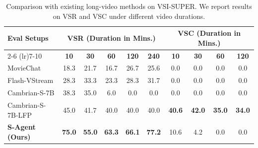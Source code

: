 \begin{table}[t]
    \centering
    \small
    \setlength{\tabcolsep}{8pt}
    \caption{Comparison with existing long-video methods on VSI-SUPER. We report results on VSR and VSC under different video durations.}
    \label{tab:vsi_super}
    \begin{tabular}{l|ccccc|cccc}
        \toprule
        \multirow{2}{*}{\textbf{Eval Setups}} 
        & \multicolumn{5}{c|}{\textbf{VSR (Duration in Mins.)}} 
        & \multicolumn{4}{c}{\textbf{VSC (Duration in Mins.)}} \\
        \cmidrule(lr){2-6} \cmidrule(lr){7-10}
        & \textbf{10} & \textbf{30} & \textbf{60} & \textbf{120} & \textbf{240}
        & \textbf{10} & \textbf{30} & \textbf{60} & \textbf{120} \\
        \midrule
        MovieChat      & 18.3 & 21.7 & 16.7 & 26.7 & 25.6 & 0.0  & 0.0  & 0.0  & 0.0  \\
        Flash-VStream  & 28.3 & 33.3 & 23.3 & 28.3 & 31.7 & 0.0  & 0.0  & 0.0  & 0.0  \\
        Cambrian-S-7B  & 38.3 & 35.0 & 6.0 & 0.0 & 0.0 & 0.0  & 0.0  & 0.0  & 0.0 \\
        Cambrian-S-7B-LFP  & 45.0 & 41.7 & 40.0 & 40.0 & 40.0 & \textbf{40.6} & \textbf{42.0} & \textbf{35.0} & \textbf{34.0} \\
        \midrule
        \textbf{S-Agent (Ours)}  & \textbf{75.0} & \textbf{55.0} & \textbf{63.3} & \textbf{66.1} & \textbf{77.2} & 10.6 & 4.2 & 0.0 & 0.0 \\
        \bottomrule
    \end{tabular}
\end{table}